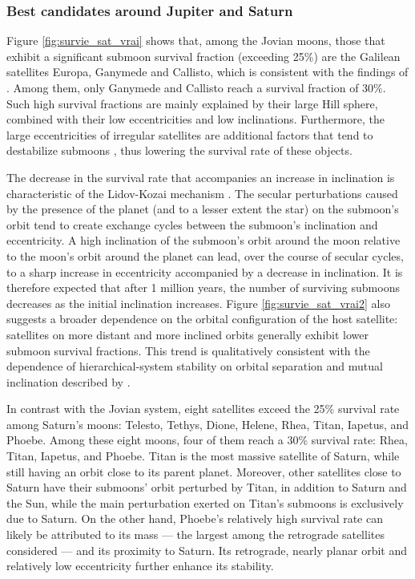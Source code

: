 \documentclass{aa}
\begin{document}
\subsubsection{Best candidates around Jupiter and Saturn}
Figure \ref{fig:survie_sat_vrai} shows that, among the Jovian moons, those that exhibit a significant submoon survival fraction (exceeding 25\%) are the Galilean satellites Europa, Ganymede and Callisto, which is consistent with the findings of \cite{Sucerquia2024}. Among them, only Ganymede and Callisto reach a survival fraction of 30\%. Such high survival fractions are mainly explained by their large Hill sphere, combined with their low eccentricities and low inclinations. Furthermore, the large eccentricities of irregular satellites are additional factors that tend to destabilize submoons \citep{Domingos_2006, Rosario-Franco_2020, Quarles_2021}, thus lowering the survival rate of these objects.

The decrease in the survival rate that accompanies an increase in inclination is characteristic of the Lidov-Kozai mechanism \citep{LIDOV1961,Kozai_1962}. The secular perturbations caused by the presence of the planet (and to a lesser extent the star) on the submoon's orbit tend to create exchange cycles between the submoon's inclination and eccentricity. A high inclination of the submoon's orbit around the moon relative to the moon's orbit around the planet can lead, over the course of secular cycles, to a sharp increase in eccentricity accompanied by a decrease in inclination. It is therefore expected that after 1 million years, the number of surviving submoons decreases as the initial inclination increases. Figure \ref{fig:survie_sat_vrai2} also suggests a broader dependence on the orbital configuration of the host satellite: satellites on more distant and more inclined orbits generally exhibit lower submoon survival fractions. This trend is qualitatively consistent with the dependence of hierarchical-system stability on orbital separation and mutual inclination described by \cite{10.1093/mnras/stw3096}.


In contrast with the Jovian system, eight satellites exceed the 25\% survival rate among Saturn's moons: Telesto, Tethys, Dione, Helene, Rhea, Titan, Iapetus, and Phoebe. Among these eight moons, four of them reach a 30\% survival rate: Rhea, Titan, Iapetus, and Phoebe. Titan is the most massive satellite of Saturn, while still having an orbit close to its parent planet. Moreover, other satellites close to Saturn have their submoons' orbit perturbed by Titan, in addition to Saturn and the Sun, while the main perturbation exerted on Titan's submoons is exclusively due to Saturn. On the other hand, Phoebe's relatively high survival rate can likely be attributed to its mass — the largest among the retrograde satellites considered — and its proximity to Saturn. Its retrograde, nearly planar orbit and relatively low eccentricity further enhance its stability.
\end{document}
